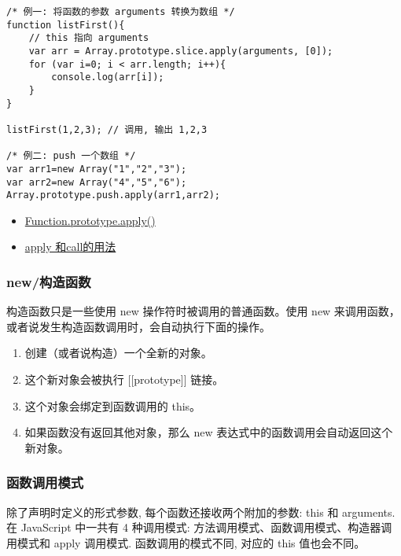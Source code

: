 \begin{enumerate}
\begin{lstlisting}
/* 例一: 将函数的参数 arguments 转换为数组 */
function listFirst(){
    // this 指向 arguments
    var arr = Array.prototype.slice.apply(arguments, [0]);
    for (var i=0; i < arr.length; i++){
        console.log(arr[i]);
    }
}

listFirst(1,2,3); // 调用, 输出 1,2,3

/* 例二: push 一个数组 */
var arr1=new Array("1","2","3");
var arr2=new Array("4","5","6");
Array.prototype.push.apply(arr1,arr2);
\end{lstlisting}
\end{enumerate}

\begin{itemize}
\tightlist
\item
  \href{https://developer.mozilla.org/zh-CN/docs/Web/JavaScript/Reference/Global_Objects/Function/apply}{Function.prototype.apply()}
\item
  \href{http://segmentfault.com/a/1190000000725712}{apply 和call的用法}
\end{itemize}

\subsubsection{new/构造函数}\label{newux6784ux9020ux51fdux6570}

构造函数只是一些使用 new 操作符时被调用的普通函数。使用 new
来调用函数，或者说发生构造函数调用时，会自动执行下面的操作。

\begin{enumerate}
\def\labelenumi{\arabic{enumi}.}
\tightlist
\item
  创建（或者说构造）一个全新的对象。
\item
  这个新对象会被执行 {[}{[}prototype{]}{]} 链接。
\item
  这个对象会绑定到函数调用的 this。
\item
  如果函数没有返回其他对象，那么 new
  表达式中的函数调用会自动返回这个新对象。
\end{enumerate}

\subsubsection{函数调用模式}\label{ux51fdux6570ux8c03ux7528ux6a21ux5f0f}

除了声明时定义的形式参数, 每个函数还接收两个附加的参数: this 和
arguments. 在 JavaScript 中一共有 4 种调用模式:
方法调用模式、函数调用模式、构造器调用模式和 apply 调用模式.
函数调用的模式不同, 对应的 this 值也会不同。


